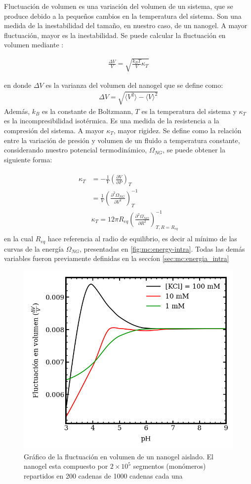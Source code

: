	Fluctuaci\'on de volumen es una variaci\'on del volumen de un sistema, que se produce debido a la peque\~nos cambios en la temperatura del sistema. Son una medida de la inestabilidad del tama\~no, en nuestro caso, de un nanogel. A mayor fluctuaci\'on, mayor es la inestabilidad.
	Se puede calcular la fluctuaci\'on en volumen mediante \cite{callen1991thermodynamics}:
	
	\begin{align}
		\frac{\Delta V}{V} = \sqrt{\frac{k_BT}{V}\kappa_T}
	\end{align}
	
	\noindent en donde $\Delta V$ es la varianza del volumen del nanogel que se define como:
	\begin{align}
		\Delta V = \sqrt{\langle V^2\rangle - \langle V \rangle^2}
	\end{align}
	Adem\'as, $k_B$ es la constante de Boltzmann, $T$ es la temperatura del sistema y $\kappa_T$ es la incompresibilidad isot\'ermica. Es una medida de la resistencia a la compresi\'on del sistema. A mayor $\kappa_T$, mayor rigidez.
	Se define como la relación entre la variaci\'on de presi\'on y  volumen de un fluido a temperatura constante, considerando nuestro potencial termodin\'amico, $\Omega_{NG}$, se puede obtener la siguiente forma:
	
	
	\begin{align}
		\begin{aligned}
			\kappa_T & = -\frac{1}{V} \left( \frac{\partial V}{\partial P}\right)_T \\
			& =\frac{1}{V} \left( \frac{\partial^2 \Omega_{NG}}{\partial V^2}\right)^{-1}_T \\
			& \kappa_T  = 12 \pi R_{eq} \left( \frac{\partial^2 \Omega_{NG}}{\partial R^2}\right)^{-1}_{T,R=R_{eq}}
		\end{aligned}
	\end{align}
	\noindent en la cual $R_{eq}$ hace referencia al radio de equilibrio, es decir al m\'inimo de las curvas de la energ\'ia $ \Omega_{NG}$, presentadas en \ref{fig:mc:energy-intra}. Todas las dem\'as variables fueron previamente definidas en la secc\'ion \ref{sec:mc:energia_intra}
	
	\begin{figure}
		\centering
		\includegraphics[width=0.45\linewidth]{Figures/graph-mc/fluct-pH.png}
		\caption{Gr\'afico de la fluctuaci\'on en volumen de un nanogel aislado. El nanogel esta compuesto por $2\times 10^5$ segmentos (mon\'omeros) repartidos en 200 cadenas de 1000 cadenas cada una}
		\label{fig:mc:flut-pH}
	\end{figure}
	
